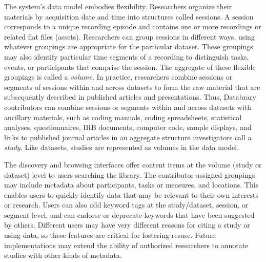 \documentclass[letterpaper,man,apacite]{apa6}
\begin{document}
The system's data model embodies flexibility. 
Researchers organize their materials by acquisition date and time into structures called sessions.
A session corresponds to a unique recording episode and contains one or more recordings or related flat files (assets). 
Researchers can group sessions in different ways, using whatever groupings are appropriate for
the particular dataset. 
These groupings may also identify particular time segments of a recording to distinguish tasks, events, or
participants that comprise the session. 
The aggregate of these flexible groupings is called a \emph{volume}. 
In practice, researchers combine sessions or segments of sessions within and across datasets to form the raw material that are subsequently described in published articles and presentations. 
Thus, Databrary contributors can combine sessions or segments within and across datasets with ancillary
materials, such as coding manuals, coding spreadsheets, statistical analyses, questionnaires, IRB documents, computer code, sample displays, and links to published journal articles in an aggregate structure investigators call a \emph{study}. 
Like datasets, studies are represented as volumes in the data model.

The discovery and browsing interfaces offer content items at the volume (study or dataset) level to users searching the library. 
The contributor-assigned groupings may include metadata about participants, tasks or measures, and locations.
This enables users to quickly identify data that may be relevant to their own interests or research.
Users can also add keyword tags at the study/dataset, session, or segment level, and can endorse or deprecate keywords that have been suggested by others. 
Different users may have very different reasons for citing a study or using data, so these features are critical for fostering resuse. 
Future implementations may extend the ability of authorized researchers to annotate studies with other kinds of metadata.
\end{document}
